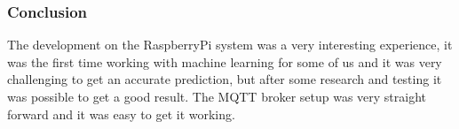 \subsubsection{Conclusion}
The development on the RaspberryPi system was a very interesting experience, it was the first time working with machine learning for some of us and it was very challenging to get an accurate prediction, but after some research and testing it was possible to get a good result. The MQTT broker setup was very straight forward and it was easy to get it working.
